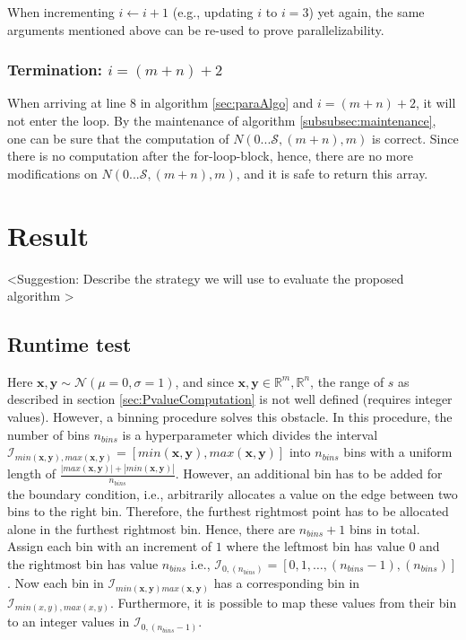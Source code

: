 \documentclass[a4paper,11pt]{article}
\begin{document}
When incrementing $i\leftarrow i+1$ (e.g., updating $i$ to $i=3$) yet again, the same arguments mentioned above can be re-used to prove parallelizability.

\subsubsection{Termination: $i=(m+n)+2$}
When arriving at line $8$ in algorithm \ref{sec:paraAlgo} and $i=(m+n)+2$, it will not enter the loop. By the maintenance of algorithm \ref{subsubsec:maintenance}, one can be sure that the computation of $N(0...\mathcal{S},(m+n),m)$ is correct. Since there is no computation after the for-loop-block, hence, there are no more modifications on $N(0...\mathcal{S},(m+n),m)$, and it is safe to return this array.



\section{Result}
\label{sec:result}

\textless Suggestion: Describe the strategy we will use to evaluate the proposed algorithm \textgreater
 
\subsection{Runtime test}
Here $\bm{x},\bm{y} \sim \mathcal{N}(\mu = 0,\sigma =1)$, and since $\bm{x},\bm{y} \in \mathbb{R}^{m}, \mathbb{R}^{n}$, the range of $s$ as described in section \ref{sec:PvalueComputation} is not well defined (requires integer values). However, a binning procedure solves this obstacle. In this procedure, the number of bins $n_{bins}$ is a hyperparameter which divides the interval $\mathcal{I}_{min(\bm{x},\bm{y}), max(\bm{x},\bm{y})}=[ min(\bm{x},\bm{y}), max(\bm{x},\bm{y}) ]$ into $n_{bins}$ bins with a uniform length of $\frac{|max(\bm{x},\bm{y})| + |min(\bm{x},\bm{y})|}{n_{bins}}$. However, an additional bin has to be added for the boundary condition, i.e., arbitrarily allocates a value on the edge between two bins to the right bin. Therefore, the furthest rightmost point has to be allocated alone in the furthest rightmost bin. Hence, there are $n_{bins}+1$ bins in total. Assign each bin with an increment of $1$ where the leftmost bin has value $0$ and the rightmost bin has value $n_{bins}$ i.e., $\mathcal{I}_{0, (n_{bins})}=[0,1,\ldots,(n_{bins}-1),(n_{bins})]$. Now each bin in $\mathcal{I}_{min(\bm{x},\bm{y}) max(\bm{x},\bm{y})}$ has a corresponding bin in $\mathcal{I}_{min(x,y), max(x,y)}$. Furthermore, it is possible to map these values from their bin to an integer values in $\mathcal{I}_{0, (n_{bins}-1)}$.
\end{document}
